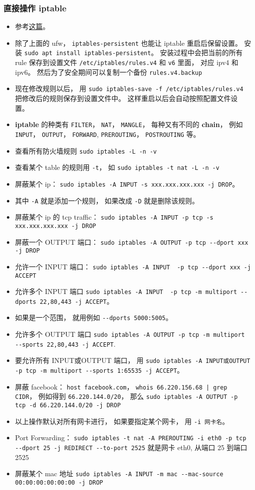 \subsubsection{直接操作 iptable}
\begin{itemize}
\item 参考\href{https://www.cyberciti.biz/faq/how-to-save-iptables-firewall-rules-permanently-on-linux/}{这篇}。
\item 除了上面的 ufw， \verb`iptables-persistent` 也能让 iptable 重启后保留设置。 安装 \verb|sudo apt install iptables-persistent|。 安装过程中会把当前的所有 rule 保存到设置文件 \verb|/etc/iptables/rules.v4| 和 \verb|v6| 里面， 对应 ipv4 和 ipv6。 然后为了安全期间可以复制一个备份 \verb|rules.v4.backup|
\item 现在修改规则以后， 用 \verb|sudo iptables-save -f /etc/iptables/rules.v4| 把修改后的规则保存到设置文件中。 这样重启以后会自动按照配置文件设置。
\item \textbf{iptable} 的种类有 \verb|FILTER|， \verb|NAT|， \verb|MANGLE|， 每种又有不同的 \textbf{chain}， 例如 \verb|INPUT|， \verb|OUTPUT|， \verb|FORWARD|,  \verb|PREROUTING|， \verb|POSTROUTING| 等。
\item 查看所有防火墙规则 \verb|sudo iptables -L -n -v|
\item 查看某个 table 的规则用 \verb|-t|， 如 \verb|sudo iptables -t nat -L -n -v|
\item 屏蔽某个 ip： \verb|sudo iptables -A INPUT -s xxx.xxx.xxx.xxx -j DROP|。
\item 其中 \verb|-A| 就是添加一个规则， 如果改成 \verb|-D| 就是删除该规则。
\item 屏蔽某个 ip 的 tcp traffic： \verb|sudo iptables -A INPUT -p tcp -s xxx.xxx.xxx.xxx -j DROP|
\item 屏蔽一个 OUTPUT 端口： \verb|sudo iptables -A OUTPUT -p tcp --dport xxx -j DROP|
\item 允许一个 INPUT 端口：  \verb|sudo iptables -A INPUT  -p tcp --dport xxx -j ACCEPT|
\item 允许多个 INPUT 端口 \verb|sudo iptables -A INPUT  -p tcp -m multiport --dports 22,80,443 -j ACCEPT|。
\item 如果是一个范围， 就用例如 \verb|--dports 5000:5005|。
\item 允许多个 OUTPUT 端口 \verb|sudo iptables -A OUTPUT -p tcp -m multiport --sports 22,80,443 -j ACCEPT|.
\item 要允许所有 INPUT或OUTPUT 端口， 用 \verb|sudo iptables -A INPUT或OUTPUT -p tcp -m multiport --sports 1:65535 -j ACCEPT|。
\item 屏蔽 facebook： \verb|host facebook.com|， \verb`whois 66.220.156.68 | grep CIDR`， 例如得到 \verb|66.220.144.0/20|， 那么 \verb|sudo iptables -A OUTPUT -p tcp -d 66.220.144.0/20 -j DROP|
\item 以上操作默认对所有网卡进行， 如果要指定某个网卡， 用 \verb|-i 网卡名|。
\item Port Forwarding： \verb|sudo iptables -t nat -A PREROUTING -i eth0 -p tcp --dport 25 -j REDIRECT --to-port 2525| 就是网卡 eth0, 从端口 25 到端口 2525
\item 屏蔽某个 mac 地址 \verb|sudo iptables -A INPUT -m mac --mac-source 00:00:00:00:00:00 -j DROP|
\end{itemize}

